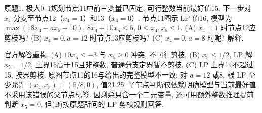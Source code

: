 \begin{exercise}\label{ass:15053-rec7-q1}
原题1. 极大0--1规划节点11中前三变量已固定, 可行整数当前最好值15, 下一步对 $x_4$ 分支至节点12（$x_4=1$）和13（$x_4=0$）. 节点11图示 LP 值16, 模型为
$\max(18x_4+ax_5+10)$, $8x_4+10x_5\le5$, $0\le x_4,x_5\le1$.
(A) $x_4=1$ 时节点12应剪枝吗? (B) $x_4=0,a=12$ 时节点13应剪枝吗? (C) $x_4=0,a=8$ 时呢? 解释.
\end{exercise}
\begin{solution}
官方解答重构. (A) $10x_5\le-3$ 与 $x_5\ge0$ 冲突, 不可行剪枝. (B) $x_5\le1/2$, LP 解 $x_5=1/2$, 上界16高于15且非整数, 普通分支定界暂不剪枝. (C) LP 上界14不超过15, 按界剪枝. 原图节点11的16与给出的完整模型不一致: 对 $a=12$ 或8, 根 LP 至少允许 $(x_4,x_5)=(5/8,0)$, 值21.25. 子节点判断仅依赖明确模型与当前最好值, 不采用该错误的父节点标签. 因剩余只含一个二元变量, 还可用额外整数推理提前判断 $x_5=0$, 但(B)按原题所问的 LP 剪枝规则回答.
\end{solution}

